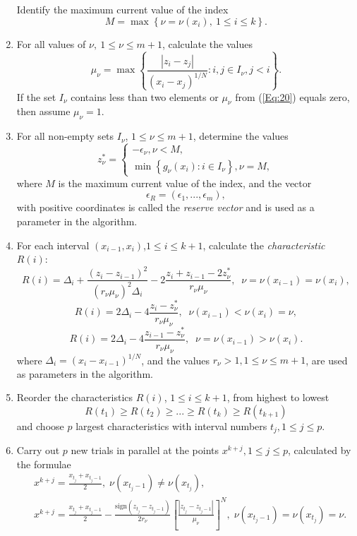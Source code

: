 \documentclass{llncs}
\begin{document}
\begin{enumerate}
Identify the maximum current value of the index
\begin{equation}\label{Eq:19}
M=\max \left\{\nu = \nu(x_i), \ 1\leq i \leq k\right\}.
\end{equation}
\item
For all values of $\nu, \ 1\leq \nu \leq m+1$, calculate the values  
\begin{equation}\label{Eq:20}
\mu_\nu = \max \left\{ \frac{\left|z_i-z_j\right|}{\left(x_i-x_j\right)^{1/N}} : i,j \in I_\nu, 
j<i\right\}.
\end{equation}
If the set $I_\nu$ contains less than two elements or $\mu_\nu$ from (\ref{Eq:20}) equals zero, 
then assume $\mu_\nu=1$.
\item
For all non-empty sets $I_\nu$, $1 \leq \nu \leq m+1$, determine the values
\begin{equation}\label{Eq:21}
  z^\ast_\nu =  
   \begin{cases}
    -\epsilon_\nu,  \nu < M, \\
    \min{\left\{g_\nu(x_i):i\in I_\nu\right\}}, \nu = M,
   \end{cases}
\end{equation}
where $M$ is the maximum current value of the index, and the vector
\begin{equation}\label{Eq:22}
\epsilon _R=\left(\epsilon_1,...,\epsilon_m\right),
\end{equation}
with positive coordinates is called the \textit{reserve vector} and is used as a parameter in the 
algorithm.
\item
For each interval $(x_{i-1},x_i)$,$1 \leq i \leq k+1$, calculate the \textit{characteristic} $R(i)$: 
\[
R(i)=\Delta_i+ \frac{(z_i-z_{i-1})^2}{(r_\nu\mu_\nu)^2\Delta_i}-2\frac{z_i+z_{i-1}-
2z^\ast_\nu}{r_\nu\mu_\nu},\;\; \nu=\nu(x_{i-1})=\nu(x_i),
\]
\[
R(i)= 2\Delta_i-4\frac{z_i-z^\ast_\nu}{r_\nu\mu_\nu},\;\; \nu(x_{i-1})<\nu(x_i)=\nu,
\]
\[
R(i)= 2\Delta_i-4\frac{z_{i-1}-z^\ast_\nu}{r_\nu\mu_\nu},\;\; \nu = \nu(x_{i-1})>\nu(x_i).
\]
where $\Delta_i=(x_i-x_{i-1})^{1/N}$, and the values $r_\nu>1, 1\leq\nu\leq m+1$, are used as 
parameters in the algorithm.
\item
Reorder the characteristics $R(i)$, $1\leq i \leq k+1$, from highest to lowest 	
\begin{equation}\label{Eq:23}
R(t_1)\geq R(t_2)\geq ... \geq R(t_{k})\geq R(t_{k+1})
\end{equation}
and choose $p$ largest characteristics with interval numbers $t_j, 1\leq j \leq p$.
\item
Carry out $p$ new trials in parallel at the points $x^{k+j}, 1 \leq j \leq p$, calculated by the 
formulae
\begin{eqnarray*}
& x^{k+j}=\frac{x_{t_j}+x_{t_j-1}}{2}, \; \nu(x_{t_j-1})\neq \nu(x_{t_j}), \\
& x^{k+j}=\frac{x_{t_j}+x_{t_j-1}}{2}- \frac{\mathrm{sign}(z_{t_j}-z_{t_j-
1})}{2r_\nu}\left[\frac{\left|z_{t_j}-z_{t_j-1}\right|}{\mu_\nu}\right]^N, \; \nu(x_{t_j-
1})=\nu(x_{t_j})=\nu. \\
\end{eqnarray*} 

\end{enumerate}
\end{document}
